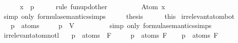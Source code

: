 \begin{isabellebody}
\ \ \ \ \isamarkupfalse%
\ {\isacartoucheopen}x\ {\isasymnoteq}\ p{\isacartoucheclose}\isanewline
\ \ \ \ \isamarkupfalse%
\ {\isacharparenleft}rule\ fun{\isacharunderscore}upd{\isacharunderscore}other{\isacharparenright}\isanewline
\ \ \isamarkupfalse%
\ \isamarkupfalse%
\ {\isachardoublequoteopen}{\isasymdots}\ {\isacharequal}\ {\isasymA}\ {\isasymTurnstile}\ {\isacharparenleft}Atom\ x{\isacharparenright}{\isachardoublequoteclose}\isanewline
\ \ \ \ \isamarkupfalse%
\ {\isacharparenleft}simp\ only{\isacharcolon}\ formula{\isacharunderscore}semantics{\isachardot}simps{\isacharparenleft}{}{\isacharparenright}{\isacharparenright}\isanewline
\ \ \isamarkupfalse%
\ \isamarkupfalse%
\ {\isacharquery}thesis\isanewline
\ \ \ \ \isamarkupfalse%
\ this\isanewline
{}\isamarkupfalse%
%
\endisatagproof
{\isafoldproof}%
%
\isadelimproof
\isanewline
%
\endisadelimproof
\isanewline
{}\isamarkupfalse%
\ irrelevant{\isacharunderscore}atom{\isacharunderscore}bot{\isacharcolon}\isanewline
\ \ \ {\isachardoublequoteopen}p\ {\isasymnotin}\ atoms\ {\isasymbottom}{\isachardoublequoteclose}\ \isanewline
\ \ \ {\isachardoublequoteopen}{\isacharparenleft}{\isasymA}{\isacharparenleft}p\ {\isacharcolon}{\isacharequal}\ V{\isacharparenright}{\isacharparenright}\ {\isasymTurnstile}\ {\isasymbottom}\ {\isasymlongleftrightarrow}\ {\isasymA}\ {\isasymTurnstile}\ {\isasymbottom}{\isachardoublequoteclose}\isanewline
%
\isadelimproof
\ \ %
\endisadelimproof
%
\isatagproof
{}\isamarkupfalse%
\ {\isacharparenleft}simp\ only{\isacharcolon}\ formula{\isacharunderscore}semantics{\isachardot}simps{\isacharparenleft}{}{\isacharparenright}{\isacharparenright}%
\endisatagproof
{\isafoldproof}%
%
\isadelimproof
\isanewline
%
\endisadelimproof
\isanewline
{}\isamarkupfalse%
\ irrelevant{\isacharunderscore}atom{\isacharunderscore}not{\isacharunderscore}l{}{\isacharcolon}\isanewline
\ \ \ {\isachardoublequoteopen}p\ {\isasymnotin}\ atoms\ {\isacharparenleft}\isactrlbold {\isasymnot}\ F{\isacharparenright}{\isachardoublequoteclose}\isanewline
\ \ \ \ \ {\isachardoublequoteopen}p\ {\isasymnotin}\ atoms\ F{\isachardoublequoteclose}\isanewline
%
\isadelimproof
%
\endisadelimproof
%
\isatagproof
{}\isamarkupfalse%
\isanewline
\ \ \isamarkupfalse%
\ {\isachardoublequoteopen}p\ {\isasymin}\ atoms\ F{\isachardoublequoteclose}\isanewline

\end{isabellebody}

